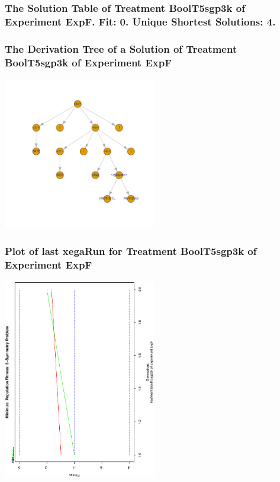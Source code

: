 \documentclass[18pt,c]{beamer}
\begin{document}
 \begin{frame}
 \fontsize{8pt}{9pt}\selectfont
 \frametitle{ The Solution Table of Treatment BoolT5sgp3k of Experiment ExpF. Fit: 0. Unique Shortest Solutions: 4. }

 \label{ExpFSolutionTable004.tex}  
 \end{frame}

 \begin{frame}
 \frametitle{ The Derivation Tree of a Solution of Treatment BoolT5sgp3k of Experiment ExpF }
 \begin{center}
\includegraphics[width=0.5\textwidth, angle=0]
{ExpFDerivationTreeFigure004.pdf}
 \end{center}
 \label{report/ExpFDerivationTreeFigure004.pdf}  
 \end{frame}

 \begin{frame}
 \frametitle{ Plot of last xegaRun for Treatment BoolT5sgp3k of Experiment ExpF }
 \begin{center}
\includegraphics[width=0.5\textwidth, angle=-90]
{ExpFPlotPopStatsFigure004.eps}
 \end{center}
 \label{report/ExpFPlotPopStatsFigure004.eps}  
 \end{frame}
\end{document}
